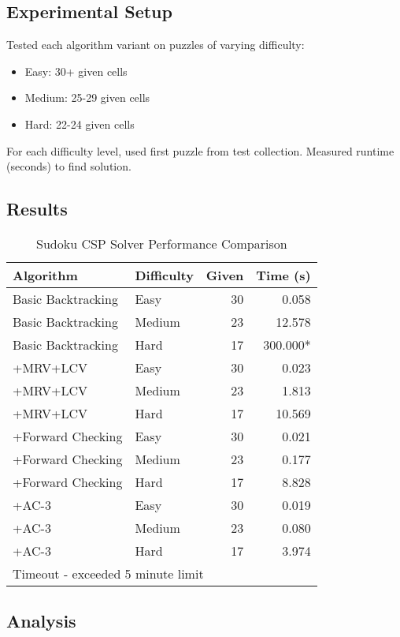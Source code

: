 \documentclass[letterpaper]{article}
\begin{document}
\subsection{Experimental Setup}

Tested each algorithm variant on puzzles of varying difficulty:
\begin{itemize}
\item Easy: 30+ given cells
\item Medium: 25-29 given cells
\item Hard: 22-24 given cells
\end{itemize}

For each difficulty level, used first puzzle from test collection. Measured runtime (seconds) to find solution.

\subsection{Results}

\begin{table}[h]
\centering
\caption{Sudoku CSP Solver Performance Comparison}
\label{tab:sudoku-results}
\begin{tabular}{@{}llrr@{}}
\toprule
\textbf{Algorithm} & \textbf{Difficulty} & \textbf{Given} & \textbf{Time (s)} \\
\midrule
Basic Backtracking & Easy & 30 & 0.058 \\
Basic Backtracking & Medium & 23 & 12.578 \\
Basic Backtracking & Hard & 17 & 300.000* \\
\midrule
+MRV+LCV & Easy & 30 & 0.023 \\
+MRV+LCV & Medium & 23 & 1.813 \\
+MRV+LCV & Hard & 17 & 10.569 \\
\midrule
+Forward Checking & Easy & 30 & 0.021 \\
+Forward Checking & Medium & 23 & 0.177 \\
+Forward Checking & Hard & 17 & 8.828 \\
\midrule
+AC-3 & Easy & 30 & 0.019 \\
+AC-3 & Medium & 23 & 0.080 \\
+AC-3 & Hard & 17 & 3.974 \\
\bottomrule
\multicolumn{4}{l}{\footnotesize *Timeout - exceeded 5 minute limit}
\end{tabular}
\end{table}

\subsection{Analysis}
\end{document}
